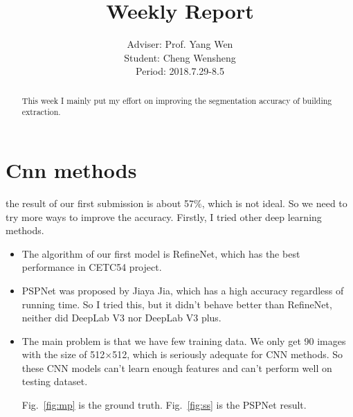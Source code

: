 \documentclass[]{IEEEtran}
\begin{document}
	\title{Weekly Report}
	\author{Adviser: Prof. Yang Wen \\Student: Cheng Wensheng\\ Period: 2018.7.29-8.5
	}
	\maketitle

\begin{abstract}
	This week I mainly put my effort on improving the segmentation accuracy of building extraction. 
\end{abstract}

\section{Cnn methods}
	 the result of our first submission is about 57$\%$, which is not ideal. So we need to try more ways to improve the accuracy. Firstly, I tried other deep learning methods. 
	\begin{itemize}
		\item The algorithm of our first model is RefineNet, which has the best performance in CETC54 project. 
		\item PSPNet was proposed by Jiaya Jia, which has a high accuracy regardless of running time. So I tried this, but it didn't behave better than RefineNet, neither did DeepLab V3 nor DeepLab V3 plus.
		\item The main problem is that we have few training data. We only get 90 images with the size of 512$\times$512, which is seriously adequate for CNN methods. So these CNN models can't learn enough features and can't perform well on testing dataset. 
		
		Fig.~\ref{fig:mp} is the ground truth. Fig.~\ref{fig:ss} is the PSPNet result.
	\end{itemize}

\end{document}
